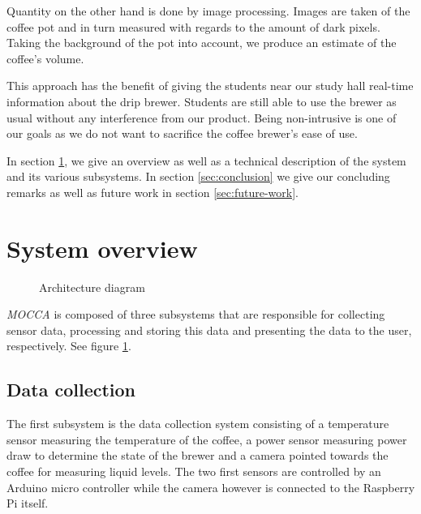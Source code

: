 \documentclass[12pt,a4paper,oneside,article]{memoir}
\numberwithin{equation}{chapter}
\begin{document}
Quantity on the other hand is done by image processing. Images are taken of the
coffee pot and in turn measured with regards to the amount of dark pixels.
Taking the background of the pot into account, we produce an estimate of
the coffee's volume.

This approach has the benefit of giving the students near our study hall 
real-time information about the drip brewer. Students are still able to use the 
brewer as usual without any interference from our product. Being non-intrusive 
is one of our goals as we do not want to sacrifice the coffee brewer's ease 
of use.

In section \ref{sec:system-overview}, we give an overview as well as a technical
description of the system and its various subsystems. In section
\ref{sec:conclusion} we give our concluding remarks as well as future work in
section \ref{sec:future-work}.

\section{System overview}\label{sec:system-overview}
\begin{figure}[h]
  \centerfloat{}
  \scalebox{.75}{}
  \caption{Architecture diagram}\label{fig:architecture}
\end{figure}
\textit{MOCCA} is composed of three subsystems that are responsible for
collecting sensor data, processing and storing this data and presenting the data
to the user, respectively. See figure \ref{fig:architecture}.

\subsection{Data collection}\label{sec:data-collection}
The first subsystem is the data collection system consisting of a temperature
sensor measuring the temperature of the coffee, a power sensor measuring power
draw to determine the state of the brewer and a camera pointed towards the
coffee for measuring liquid levels. The two first sensors are controlled by an
Arduino micro controller while the camera however is connected to the Raspberry
Pi itself.
\end{document}
